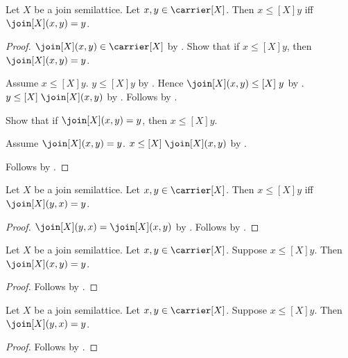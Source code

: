 \begin{proposition}\label{leq_iff_join_eq_right}
    Let $X$ be a join semilattice.
    Let $x,y\in\carrier[X]$.
    Then $x\mathrel{\leq[X]}y$ iff $\join[X](x,y)=y$.
\end{proposition}
\begin{proof}
    $\join[X](x,y)\in\carrier[X]$ by .
    Show that if $x\mathrel{\leq[X]}y$, then $\join[X](x,y)=y$.
    \begin{subproof}
        Assume $x\mathrel{\leq[X]}y$.
        $y\mathrel{\leq[X]}y$ by
            .
        Hence $\join[X](x,y)\mathrel{\leq[X]}y$ by .
        $y\mathrel{\leq[X]}\join[X](x,y)$ by .
        Follows by
            .
    \end{subproof}
    Show that if $\join[X](x,y)=y$, then $x\mathrel{\leq[X]}y$.
    \begin{subproof}
        Assume $\join[X](x,y)=y$.
        $x\mathrel{\leq[X]}\join[X](x,y)$ by .
    \end{subproof}
    Follows by \auto.
\end{proof}

\begin{proposition}\label{leq_iff_join_eq_left}
    Let $X$ be a join semilattice.
    Let $x,y\in\carrier[X]$.
    Then $x\mathrel{\leq[X]}y$ iff $\join[X](y,x)=y$.
\end{proposition}
\begin{proof}
    $\join[X](y,x)=\join[X](x,y)$ by .
    Follows by .
\end{proof}

\begin{proposition}\label{join_eq_right_of_leq}
    Let $X$ be a join semilattice.
    Let $x,y\in\carrier[X]$.
    Suppose $x\mathrel{\leq[X]}y$.
    Then $\join[X](x,y)=y$.
\end{proposition}
\begin{proof}
    Follows by .
\end{proof}

\begin{proposition}\label{join_eq_left_of_leq}
    Let $X$ be a join semilattice.
    Let $x,y\in\carrier[X]$.
    Suppose $x\mathrel{\leq[X]}y$.
    Then $\join[X](y,x)=y$.
\end{proposition}
\begin{proof}
    Follows by .
\end{proof}

